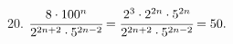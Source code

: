 20. $\cfrac{8\cdot100^n}{2^{2n+2}\cdot5^{2n-2}}=\cfrac{2^3\cdot2^{2n}\cdot5^{2n}}{2^{2n+2}\cdot5^{2n-2}}=50.$\\
